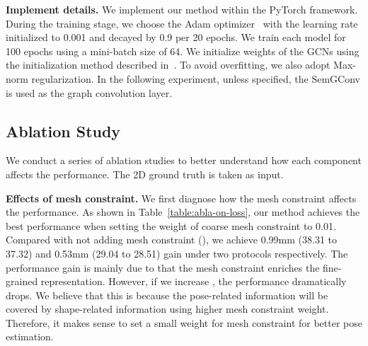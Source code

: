 \documentclass{bmvc2k}
\begin{document}
{\bf Implement details.}
We implement our method within the PyTorch framework. During the training stage, we choose the Adam optimizer~\cite{kingma2014adam} with the learning rate initialized to 0.001 and decayed by 0.9 per 20 epochs. We train each model for 100 epochs using a mini-batch size of 64. We initialize weights of the GCNs using the initialization method described in~\cite{glorot2010understanding}. To avoid overfitting, we also adopt Max-norm regularization. In the following experiment, unless specified, the SemGConv is used as the graph convolution layer.

\subsection{Ablation Study}
\label{sec:ablation}
We conduct a series of ablation studies to better understand how each component affects the performance. The 2D ground truth is taken as input. 

{\bf Effects of mesh constraint.} We first diagnose how the mesh constraint affects the performance. As shown in Table~\ref{table:abla-on-loss}, our method achieves the best performance when setting the weight of coarse mesh constraint  to 0.01. Compared with not adding mesh constraint (), we achieve 0.99mm (38.31 to 37.32) and 0.53mm (29.04 to 28.51) gain under two protocols respectively. The performance gain is mainly due to that the mesh constraint enriches the fine-grained representation. However, if we increase , the performance dramatically drops. We believe that this is because the pose-related information will be covered by shape-related information using higher mesh constraint weight. Therefore, it makes sense to set a small weight for mesh constraint for better pose estimation.
\end{document}
